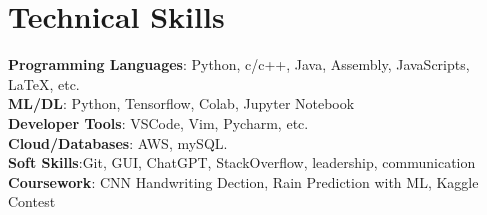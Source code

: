 \documentclass[a4paper,11pt]{article}
\makeatletter
\newcommand{\resumePOR}[3]{
\vspace{0.5mm}\item
    \begin{tabular*}{0.97\textwidth}[t]{l@{\extracolsep{\fill}}r}
        \textbf{#1}\hspace{0.3mm}#2 & \textit{\small{#3}} 
    \end{tabular*}
    \vspace{-2mm}
}
\newcommand{\resumeSubHeadingListStart}{\begin{itemize}[leftmargin=*,labelsep=0mm]}
\newcommand{\resumeSubHeadingListEnd}{\end{itemize}\vspace{2mm}}
\makeatother
\begin{document}
  \section{\textbf{Technical Skills}}
  \begin{itemize}[leftmargin=0.05in, label={}]
    \vspace{1.0mm}
    {\item{
      \textbf{Programming Languages}{: Python, c/c++, Java, Assembly, JavaScripts, LaTeX, etc.} \\
      \textbf{ML/DL}{: Python, Tensorflow, Colab, Jupyter Notebook} \\
      \textbf{Developer Tools}{: VSCode, Vim, Pycharm, etc.} \\
      \textbf{Cloud/Databases}{: AWS, mySQL.} \\
      \textbf{Soft Skills}{:Git, GUI, ChatGPT, StackOverflow, leadership, communication} \\
      \textbf{Coursework}{: CNN Handwriting Dection, Rain Prediction with ML, Kaggle Contest} \\
    }}
 \end{itemize}
 \vspace{-16pt}



\end{document}
